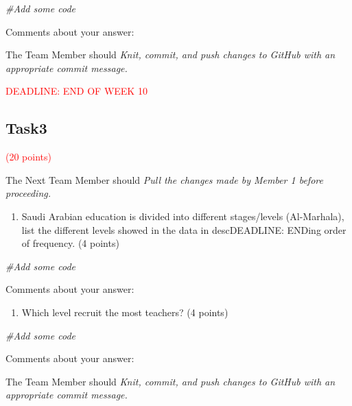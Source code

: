 \documentclass[
]{article}
\newenvironment{Shaded}{\begin{snugshade}}{\end{snugshade}}
\newcommand{\CommentTok}[1]{\textcolor[rgb]{0.56,0.35,0.01}{\textit{#1}}}
\providecommand{\tightlist}{%
  \setlength{\itemsep}{0pt}\setlength{\parskip}{0pt}}
\begin{document}
\begin{Shaded}
\begin{Highlighting}[]
\CommentTok{\#Add some code}
\end{Highlighting}
\end{Shaded}

Comments about your answer:

The Team Member should \emph{Knit, commit, and push changes to GitHub
with an appropriate commit message.}

\textcolor{red}{DEADLINE: END OF WEEK 10}

\hypertarget{task3}{%
\subsection{Task3}\label{task3}}

\textcolor{red}{(20 points)}

The Next Team Member should \emph{Pull the changes made by Member 1
before proceeding.}

\begin{enumerate}
\def\labelenumi{(\alph{enumi})}
\tightlist
\item
  Saudi Arabian education is divided into different stages/levels
  (Al-Marhala), list the different levels showed in the data in
  descDEADLINE: ENDing order of frequency. (4 points)
\end{enumerate}

\begin{Shaded}
\begin{Highlighting}[]
\CommentTok{\#Add some code}
\end{Highlighting}
\end{Shaded}

Comments about your answer:

\begin{enumerate}
\def\labelenumi{(\alph{enumi})}
\setcounter{enumi}{1}
\tightlist
\item
  Which level recruit the most teachers? (4 points)
\end{enumerate}

\begin{Shaded}
\begin{Highlighting}[]
\CommentTok{\#Add some code}
\end{Highlighting}
\end{Shaded}

Comments about your answer:

The Team Member should \emph{Knit, commit, and push changes to GitHub
with an appropriate commit message.}
\end{document}
